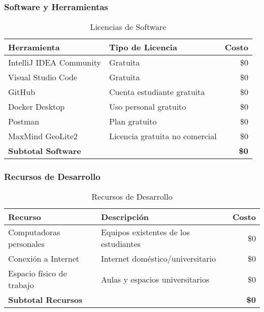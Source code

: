 \subsubsection{Software y Herramientas}

\begin{table}[H]
    \centering
    \small
    \begin{tabular}{|l|l|r|}
        \hline
        \textbf{Herramienta} & \textbf{Tipo de Licencia} & \textbf{Costo} \\
        \hline
        IntelliJ IDEA Community & Gratuita & \$0 \\
        \hline
        Visual Studio Code & Gratuita & \$0 \\
        \hline
        GitHub & Cuenta estudiante gratuita & \$0 \\
        \hline
        Docker Desktop & Uso personal gratuito & \$0 \\
        \hline
        Postman & Plan gratuito & \$0 \\
        \hline
        MaxMind GeoLite2 & Licencia gratuita no comercial & \$0 \\
        \hline
        \textbf{Subtotal Software} & & \textbf{\$0} \\
        \hline
    \end{tabular}
    \caption{Licencias de Software}
    \label{tab:software}
\end{table}

\subsubsection{Recursos de Desarrollo}

\begin{table}[H]
    \centering
    \small
    \begin{tabular}{|l|l|r|}
        \hline
        \textbf{Recurso} & \textbf{Descripción} & \textbf{Costo} \\
        \hline
        Computadoras personales & Equipos existentes de los estudiantes & \$0 \\
        \hline
        Conexión a Internet & Internet doméstico/universitario & \$0 \\
        \hline
        Espacio físico de trabajo & Aulas y espacios universitarios & \$0 \\
        \hline
        \textbf{Subtotal Recursos} & & \textbf{\$0} \\
        \hline
    \end{tabular}
    \caption{Recursos de Desarrollo}
    \label{tab:recursos_desarrollo}
\end{table}

